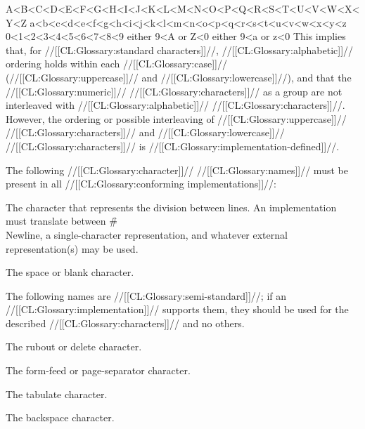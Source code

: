 \code
 A<B<C<D<E<F<G<H<I<J<K<L<M<N<O<P<Q<R<S<T<U<V<W<X<Y<Z
 a<b<c<d<e<f<g<h<i<j<k<l<m<n<o<p<q<r<s<t<u<v<w<x<y<z
 0<1<2<3<4<5<6<7<8<9
 either 9<A or Z<0
 either 9<a or z<0                                                      
\endcode
{}
This implies that, for //[[CL:Glossary:standard characters]]//, //[[CL:Glossary:alphabetic]]// 
ordering holds within each //[[CL:Glossary:case]]// (//[[CL:Glossary:uppercase]]// and //[[CL:Glossary:lowercase]]//), 
and that the //[[CL:Glossary:numeric]]// //[[CL:Glossary:characters]]// as a group are not interleaved
with //[[CL:Glossary:alphabetic]]// //[[CL:Glossary:characters]]//.
However, the ordering or possible interleaving of //[[CL:Glossary:uppercase]]// //[[CL:Glossary:characters]]//
and //[[CL:Glossary:lowercase]]// //[[CL:Glossary:characters]]// is //[[CL:Glossary:implementation-defined]]//.


\endsubSection%


The following //[[CL:Glossary:character]]// //[[CL:Glossary:names]]// must be present in all 
//[[CL:Glossary:conforming implementations]]//:


\beginlist
{}


The character that represents the division between lines.
An implementation must translate between \f{\#\\Newline}, 
a single-character representation, and whatever external representation(s)
may be used.



The space or blank character.
\endlist

The following names are //[[CL:Glossary:semi-standard]]//; 
if an //[[CL:Glossary:implementation]]// supports them,
they should be used for the described //[[CL:Glossary:characters]]// and no others.

\beginlist         
{}

The rubout or delete character.



The form-feed or page-separator character.



The tabulate character.



The backspace character.


